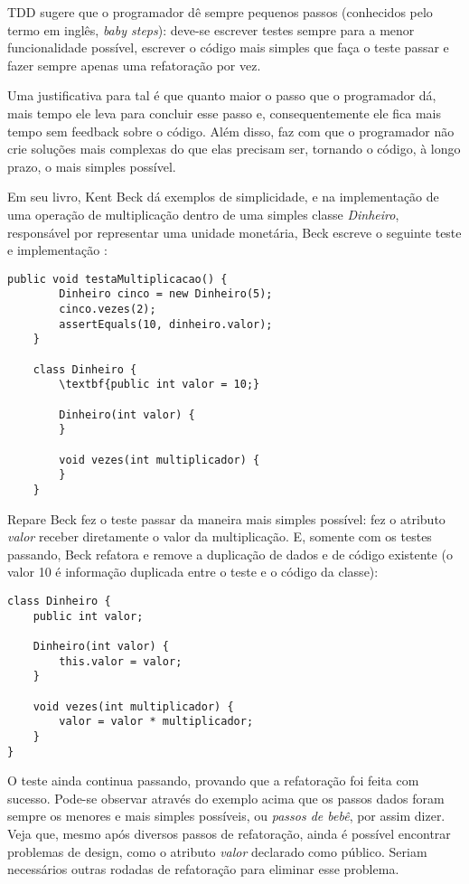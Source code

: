 TDD sugere que o programador dê sempre pequenos passos (conhecidos pelo termo em
inglês, \textit{baby steps}): deve-se escrever testes sempre para a menor
funcionalidade possível, escrever o código mais simples que faça o teste passar
e fazer sempre apenas uma refatoração por vez.

Uma justificativa para tal é que quanto maior o passo que o programador dá, mais
tempo ele leva para concluir esse passo e, consequentemente ele fica mais tempo
sem feedback sobre o código. Além disso, faz com que o programador não crie
soluções mais complexas do que elas precisam ser, tornando o código, à longo
prazo, o mais simples possível.

Em seu livro, Kent Beck dá exemplos de simplicidade, e na implementação de uma
operação de multiplicação dentro de uma simples classe \textit{Dinheiro},
responsável por representar uma unidade monetária, Beck escreve o seguinte
teste e implementação \cite{TDDByExample}:

\begin{lstlisting}[frame=trbl]
    public void testaMultiplicacao() {
		Dinheiro cinco = new Dinheiro(5);
		cinco.vezes(2);
		assertEquals(10, dinheiro.valor);
	}
	
	class Dinheiro {
		\textbf{public int valor = 10;}
		
		Dinheiro(int valor) {
		}
		
		void vezes(int multiplicador) {
		}
	}

\end{lstlisting}

Repare Beck fez o teste passar da maneira mais simples possível: fez o atributo
\textit{valor} receber diretamente o valor da multiplicação. E, somente com os
testes passando, Beck refatora e remove a duplicação de dados e de código
existente (o valor 10 é informação duplicada entre o teste e o código da
classe):

\begin{lstlisting}[frame=trbl]
class Dinheiro {
	public int valor;
	
	Dinheiro(int valor) {
		this.valor = valor;
	}
	
	void vezes(int multiplicador) {
		valor = valor * multiplicador;
	}
}
\end{lstlisting}

O teste ainda continua passando, provando que a refatoração foi feita com
sucesso. Pode-se observar através do exemplo acima que os passos dados foram
sempre os menores e mais simples possíveis, ou \textit{passos de bebê}, por
assim dizer. Veja que, mesmo após diversos passos de refatoração, ainda é
possível encontrar problemas de design, como o atributo \textit{valor}
declarado como público. Seriam necessários outras rodadas de refatoração para
eliminar esse problema.

